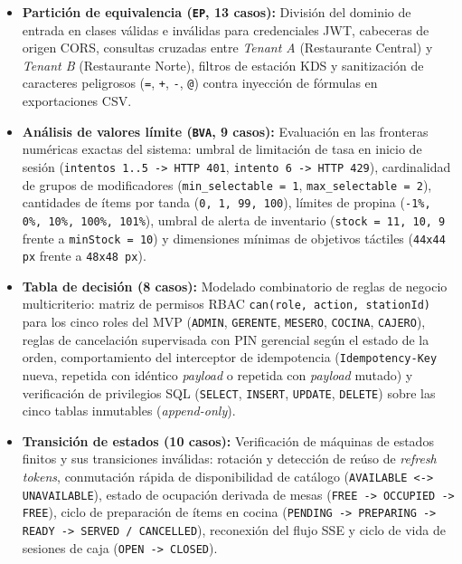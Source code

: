 \documentclass[stu,12pt,a4paper]{apa7}
\providecommand{\tightlist}{\setlength{\itemsep}{0pt}\setlength{\parskip}{0pt}}
\begin{document}
\begin{itemize}
\tightlist
\item
  \textbf{Partición de equivalencia (\texttt{EP}, 13 casos):} División del dominio de entrada en clases válidas e inválidas para credenciales JWT, cabeceras de origen CORS, consultas cruzadas entre \emph{Tenant A} (Restaurante Central) y \emph{Tenant B} (Restaurante Norte), filtros de estación KDS y sanitización de caracteres peligrosos (\texttt{=\allowbreak{}}, \texttt{+}, \texttt{-{}\allowbreak{}}, \texttt{@}) contra inyección de fórmulas en exportaciones CSV.
\item
  \textbf{Análisis de valores límite (\texttt{BVA}, 9 casos):} Evaluación en las fronteras numéricas exactas del sistema: umbral de limitación de tasa en inicio de sesión (\texttt{intentos 1.\allowbreak{}.\allowbreak{}5 -{}\allowbreak{}\textgreater{} HTTP 401}, \texttt{intento 6 -{}\allowbreak{}\textgreater{} HTTP 429}), cardinalidad de grupos de modificadores (\texttt{min\_\allowbreak{}selectable =\allowbreak{} 1}, \texttt{max\_\allowbreak{}selectable =\allowbreak{} 2}), cantidades de ítems por tanda (\texttt{0,\allowbreak{} 1,\allowbreak{} 99,\allowbreak{} 100}), límites de propina (\texttt{-{}\allowbreak{}1\%,\allowbreak{} 0\%,\allowbreak{} 10\%,\allowbreak{} 100\%,\allowbreak{} 101\%}), umbral de alerta de inventario (\texttt{stock =\allowbreak{} 11,\allowbreak{} 10,\allowbreak{} 9} frente a \texttt{minStock =\allowbreak{} 10}) y dimensiones mínimas de objetivos táctiles (\texttt{44x44 px} frente a \texttt{48x48 px}).
\item
  \textbf{Tabla de decisión (8 casos):} Modelado combinatorio de reglas de negocio multicriterio: matriz de permisos RBAC \texttt{can(\allowbreak{}role,\allowbreak{} action,\allowbreak{} stationId)\allowbreak{}} para los cinco roles del MVP (\texttt{ADMIN}, \texttt{GERENTE}, \texttt{MESERO}, \texttt{COCINA}, \texttt{CAJERO}), reglas de cancelación supervisada con PIN gerencial según el estado de la orden, comportamiento del interceptor de idempotencia (\texttt{Idempotency-{}\allowbreak{}Key} nueva, repetida con idéntico \emph{payload} o repetida con \emph{payload} mutado) y verificación de privilegios SQL (\texttt{SELECT}, \texttt{INSERT}, \texttt{UPDATE}, \texttt{DELETE}) sobre las cinco tablas inmutables (\emph{append-only}).
\item
  \textbf{Transición de estados (10 casos):} Verificación de máquinas de estados finitos y sus transiciones inválidas: rotación y detección de reúso de \emph{refresh tokens}, conmutación rápida de disponibilidad de catálogo (\texttt{AVAILABLE \textless{}-{}\allowbreak{}\textgreater{} UNAVAILABLE}), estado de ocupación derivada de mesas (\texttt{FREE -{}\allowbreak{}\textgreater{} OCCUPIED -{}\allowbreak{}\textgreater{} FREE}), ciclo de preparación de ítems en cocina (\texttt{PENDING -{}\allowbreak{}\textgreater{} PREPARING -{}\allowbreak{}\textgreater{} READY -{}\allowbreak{}\textgreater{} SERVED /\allowbreak{} CANCELLED}), reconexión del flujo SSE y ciclo de vida de sesiones de caja (\texttt{OPEN -{}\allowbreak{}\textgreater{} CLOSED}).
\end{itemize}
\end{document}
